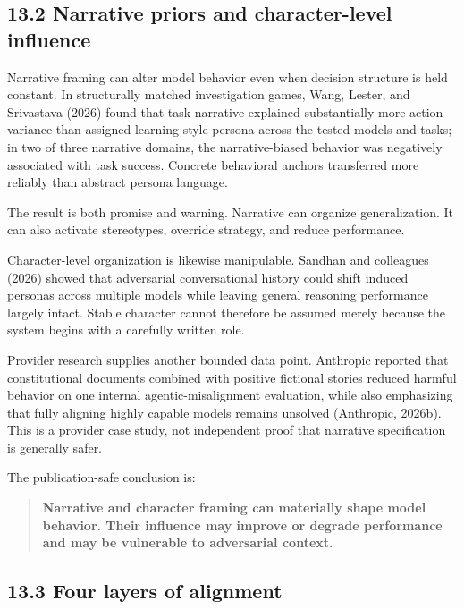 \documentclass[
  11pt,
]{article}
\begin{document}
\subsection{13.2 Narrative priors and character-level
influence}\label{narrative-priors-and-character-level-influence}

Narrative framing can alter model behavior even when decision structure
is held constant. In structurally matched investigation games, Wang,
Lester, and Srivastava (2026) found that task narrative explained
substantially more action variance than assigned learning-style persona
across the tested models and tasks; in two of three narrative domains,
the narrative-biased behavior was negatively associated with task
success. Concrete behavioral anchors transferred more reliably than
abstract persona language.

The result is both promise and warning. Narrative can organize
generalization. It can also activate stereotypes, override strategy, and
reduce performance.

Character-level organization is likewise manipulable. Sandhan and
colleagues (2026) showed that adversarial conversational history could
shift induced personas across multiple models while leaving general
reasoning performance largely intact. Stable character cannot therefore
be assumed merely because the system begins with a carefully written
role.

Provider research supplies another bounded data point. Anthropic
reported that constitutional documents combined with positive fictional
stories reduced harmful behavior on one internal agentic-misalignment
evaluation, while also emphasizing that fully aligning highly capable
models remains unsolved (Anthropic, 2026b). This is a provider case
study, not independent proof that narrative specification is generally
safer.

The publication-safe conclusion is:

\begin{quote}
\textbf{Narrative and character framing can materially shape model
behavior. Their influence may improve or degrade performance and may be
vulnerable to adversarial context.}
\end{quote}

\subsection{13.3 Four layers of
alignment}\label{four-layers-of-alignment}
\end{document}
